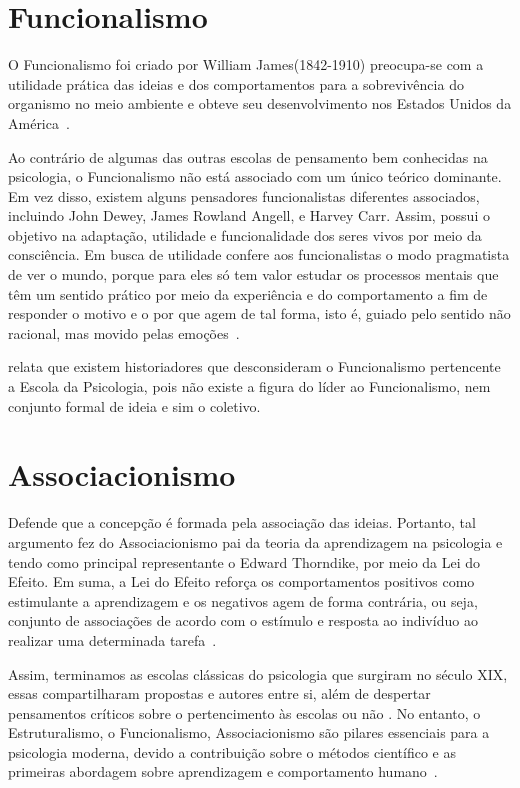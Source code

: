 \section{Funcionalismo}\label{funcionalismo}

O Funcionalismo foi criado por William James(1842-1910) preocupa-se com a utilidade prática das ideias e dos comportamentos para a sobrevivência do organismo no meio ambiente e obteve seu desenvolvimento nos Estados Unidos da América~\cite{hothersall1997historia}.

Ao contrário de algumas das outras escolas de pensamento bem conhecidas na psicologia, o Funcionalismo não está associado com um único teórico dominante. 
Em vez disso, existem alguns pensadores funcionalistas diferentes associados, incluindo John Dewey, James Rowland Angell, e Harvey Carr.
Assim, possui o objetivo na adaptação, utilidade e funcionalidade dos seres vivos por meio da consciência.
Em busca de utilidade confere aos funcionalistas o modo pragmatista de ver o mundo, porque para eles só tem valor estudar os processos mentais que têm um sentido prático por meio da experiência e do comportamento a fim de responder o motivo e o por que agem de tal forma, isto é, guiado pelo sentido não racional, mas movido pelas emoções~\cite{bock1999psicologias,silva2007psicologia_educacao}.

 relata que existem historiadores que desconsideram o Funcionalismo pertencente a Escola da Psicologia, pois não existe a figura do líder ao Funcionalismo, nem conjunto formal de ideia e sim o coletivo. 


\section{Associacionismo}

Defende que a concepção é formada pela associação das ideias.
Portanto, tal argumento fez do Associacionismo pai da teoria da aprendizagem na psicologia e tendo como principal representante o Edward Thorndike, por meio da Lei do Efeito.
Em suma, a Lei do Efeito reforça os comportamentos positivos como estimulante a aprendizagem e os negativos agem de forma contrária, ou seja, conjunto de associações de acordo com o estímulo e resposta ao indivíduo ao realizar uma determinada tarefa~\cite{bock1999psicologias}.


Assim, terminamos as escolas clássicas do psicologia que surgiram no século XIX, essas compartilharam propostas e autores entre si, além de despertar pensamentos críticos sobre o pertencimento às escolas ou não \cite{hothersall1997historia}.
No entanto, o Estruturalismo, o Funcionalismo, Associacionismo são pilares essenciais para a psicologia moderna, devido a contribuição sobre o métodos científico e as primeiras abordagem sobre aprendizagem e comportamento humano~\cite{bock1999psicologias}.
